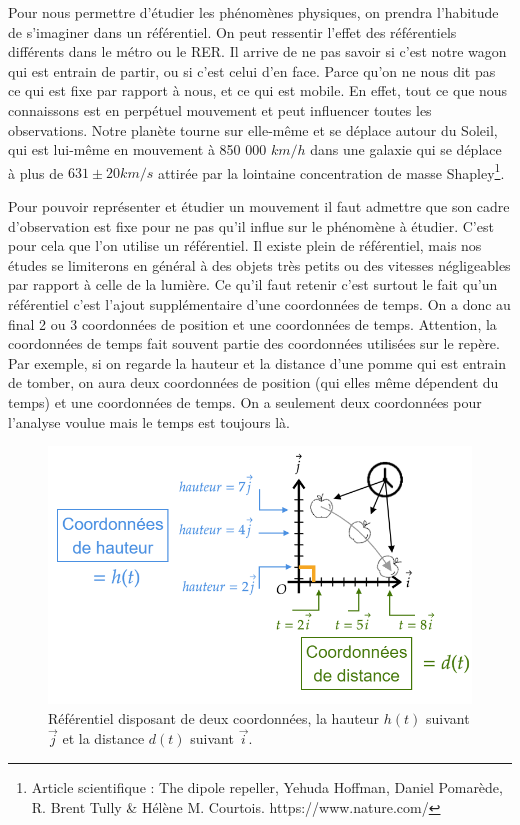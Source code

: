 \documentclass[
	11pt, %
	fleqn, %
	a4paper, %
]{LegrandOrangeBook}
\begin{document}
Pour nous permettre d'étudier les phénomènes physiques, on prendra l'habitude de s'imaginer dans un référentiel. On peut ressentir l'effet des référentiels différents dans le métro ou le RER. Il arrive de ne pas savoir si c'est notre wagon qui est entrain de partir, ou si c'est celui d'en face. Parce qu'on ne nous dit pas ce qui est fixe par rapport à nous, et ce qui est mobile. En effet, tout ce que nous connaissons est en perpétuel mouvement et peut influencer toutes les observations. Notre planète tourne sur elle-même et se déplace autour du Soleil, qui est lui-même en mouvement à 850 000 $km/h$ dans une galaxie qui se déplace à plus de $631\pm 20 km/s$ attirée par la lointaine concentration de masse Shapley\footnote{Article scientifique : The dipole repeller, Yehuda Hoffman, Daniel Pomarède, R. Brent Tully \& Hélène M. Courtois. https://www.nature.com/}.

Pour pouvoir représenter et étudier un mouvement il faut admettre que son cadre d'observation est fixe pour ne pas qu'il influe sur le phénomène à étudier. C'est pour cela que l'on utilise un référentiel. Il existe plein de référentiel, mais nos études se limiterons en général à des objets très petits ou des vitesses négligeables par rapport à celle de la lumière. Ce qu'il faut retenir c'est surtout le fait qu'un référentiel c'est l'ajout supplémentaire d'une coordonnées de temps. On a donc au final 2 ou 3 coordonnées de position et une coordonnées de temps. Attention, la coordonnées de temps fait souvent partie des coordonnées utilisées sur le repère. Par exemple, si on regarde la hauteur et la distance d'une pomme qui est entrain de tomber, on aura deux coordonnées de position (qui elles même dépendent du temps) et une coordonnées de temps. On a seulement deux coordonnées pour l'analyse voulue mais le temps est toujours là.



\begin{figure}[H] %
	\centering %
	\includegraphics[width=1\textwidth]{Images/ref2.png} %
	\caption{Référentiel disposant de deux coordonnées, la hauteur $h(t)$ suivant $\Vec{j}$ et la distance $d(t)$ suivant $\Vec{i}$.}
	\label{ref2} %
\end{figure}
\end{document}
